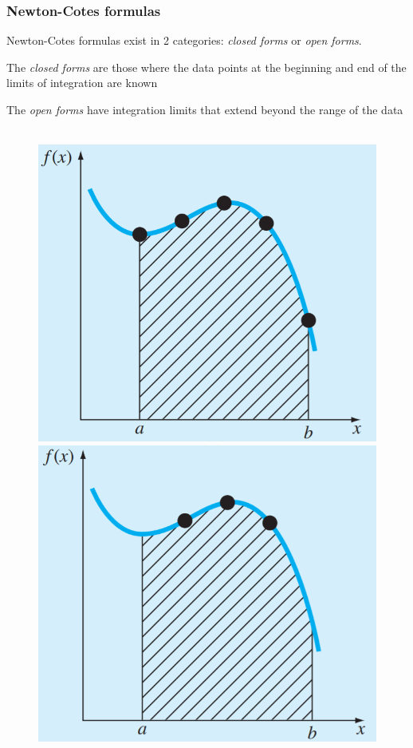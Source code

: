 \documentclass{if-beamer}
\begin{document}
\begin{frame}[t]
	\frametitle{Newton-Cotes formulas}
	Newton-Cotes formulas exist in 2 categories: \textit{closed forms} or \textit{open forms}. \\\vspace{10pt}
	\begin{minipage}{0.5\textwidth}
		The \textit{closed forms}
		are those where the data points at the beginning and end of the limits of integration are
		known \\\vspace{40pt}
		
		The \textit{open forms} have integration limits that extend beyond the range of the data 
	\end{minipage}
	\begin{minipage}{0.5\textwidth}
		\begin{figure}
			\centering
			\\\vspace{5pt}
			\includegraphics[width=.55\textwidth]{figures/closed}\\\vspace{5pt}
			\includegraphics[width=.55\textwidth]{figures/open}
		\end{figure}
	\end{minipage}	
\end{frame}
\end{document}
